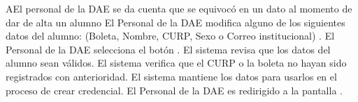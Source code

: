 \begin{UCtrayectoriaA}{A}{El personal de la DAE se da cuenta que se equivocó en un dato al momento de dar de alta un alumno }
    \UCpaso[\UCactor] El Personal de la DAE modifica alguno de los siguientes datos del alumno: (Boleta, Nombre, CURP, Sexo o Correo institucional) .
    \UCpaso[\UCactor] El Personal de la DAE selecciona el botón .
    \UCpaso El sistema revisa que los datos del alumno sean válidos.
    \UCpaso El sistema verifica que el CURP o la boleta no hayan sido registrados con anterioridad.
    \UCpaso El sistema mantiene los datos para usarlos en el proceso de crear credencial.
    \UCpaso[\UCactor] El Personal de la DAE es redirigido a la pantalla .
\end{UCtrayectoriaA}


